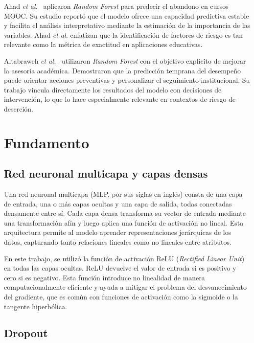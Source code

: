 \documentclass[conference]{IEEEtran}
\begin{document}
Ahad \textit{et al.}~\cite{rf_mooc} aplicaron \textit{Random Forest} para predecir el abandono en cursos MOOC. Su estudio reportó que el modelo ofrece una capacidad predictiva estable y facilita el análisis interpretativo mediante la estimación de la importancia de las variables. Ahad \textit{et al.} enfatizan que la identificación de factores de riesgo es tan relevante como la métrica de exactitud en aplicaciones educativas.

Altabraweh \textit{et al.}~\cite{rf_advising} utilizaron \textit{Random Forest} con el objetivo explícito de mejorar la asesoría académica. Demostraron que la predicción temprana del desempeño puede orientar acciones preventivas y personalizar el seguimiento institucional. Su trabajo vincula directamente los resultados del modelo con decisiones de intervención, lo que lo hace especialmente relevante en contextos de riesgo de deserción.

\section{Fundamento}\label{sec:fundamento}

\subsection{Red neuronal multicapa y capas densas}

Una red neuronal multicapa (MLP, por sus siglas en inglés) consta de una capa de entrada, una o más capas ocultas y una capa de salida, todas conectadas densamente entre sí. Cada capa densa transforma su vector de entrada mediante una transformación afín y luego aplica una función de activación no lineal. Esta arquitectura permite al modelo aprender representaciones jerárquicas de los datos, capturando tanto relaciones lineales como no lineales entre atributos.

En este trabajo, se utilizó la función de activación ReLU (\textit{Rectified Linear Unit}) en todas las capas ocultas. ReLU devuelve el valor de entrada si es positivo y cero si es negativo. Esta función introduce no linealidad de manera computacionalmente eficiente y ayuda a mitigar el problema del desvanecimiento del gradiente, que es común con funciones de activación como la sigmoide o la tangente hiperbólica.

\subsection{Dropout}
\end{document}
